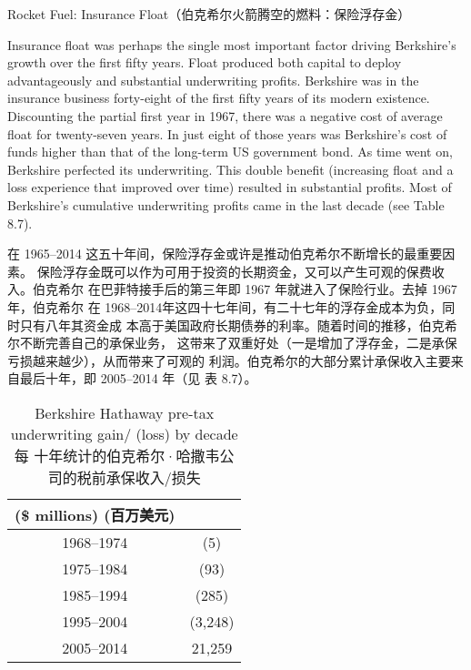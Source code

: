 \begin{section}{Rocket Fuel: Insurance Float（伯克希尔火箭腾空的燃料：保险浮存金）}
\begin{verseparallel}
  {
    Insurance float was perhaps the single most important factor driving
    Berkshire's growth over the first fifty years. Float produced both capital
    to deploy advantageously and substantial underwriting profits. Berkshire was
    in the insurance business forty-eight of the first fifty years of its modern
    existence. Discounting the partial first year in 1967, there was a negative
    cost of average float for twenty-seven years. In just eight of those years
    was Berkshire's cost of funds higher than that of the long-term US
    government bond. As time went on, Berkshire perfected its underwriting. This
    double benefit (increasing float and a loss experience that improved over
    time) resulted in substantial profits. Most of Berkshire's cumulative
    underwriting profits came in the last decade (see Table 8.7). \\
  }
  {

    在 1965--2014 这五十年间，保险浮存金或许是推动伯克希尔不断增长的最重要因素。
    保险浮存金既可以作为可用于投资的长期资金，又可以产生可观的保费收入。伯克希尔
    在巴菲特接手后的第三年即 1967 年就进入了保险行业。去掉 1967 年，伯克希尔
    在 1968--2014年这四十七年间，有二十七年的浮存金成本为负，同时只有八年其资金成
    本高于美国政府长期债券的利率。随着时间的推移，伯克希尔不断完善自己的承保业务，
    这带来了双重好处（一是增加了浮存金，二是承保亏损越来越少），从而带来了可观的
    利润。伯克希尔的大部分累计承保收入主要来自最后十年，即 2005--2014 年（见
    表 8.7）。

  }
\end{verseparallel}

\begin{table}[!htbp]
  \centering
  \begin{center}
    \begin{tabular}{cc}
      \toprule
      \makecell[c]{(\$ millions) \\ (百万美元)} & \\
      \midrule
      1968--1974 & (5) \\
      1975--1984 & (93) \\
      1985--1994 & (285) \\
      1995--2004 & (3,248) \\
      2005--2014 & 21,259 \\
      \bottomrule
    \end{tabular}
    \caption{Berkshire Hathaway pre-tax underwriting gain/ (loss) by decade \\ 每
      十年统计的伯克希尔·哈撒韦公司的税前承保收入/损失}
  \end{center}
\end{table}

{\color{red}{此处缺图 8.1}} \\

\end{section}


